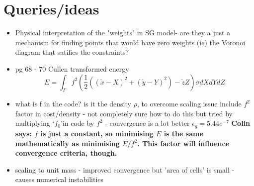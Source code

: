\documentclass[]{article}
\newcommand{\comments}[2]{{\bfseries #1 says: #2}}
\begin{document}
	\section{Queries/ideas}
	\begin{itemize}
		\item Physical interpretation of 
		the "weights" in SG model- are they a just a mechanism for finding points that would have zero weights (ie) the Voronoi diagram that satifies the constraints?
		\item pg 68 - 70 Cullen \cite{Cullen2008} transformed energy
		 \begin{equation}
		 E = \int_ \Gamma f^2 \left(\frac{1}{2}\left(\left( \tilde{x} - X\right)^2 +\left(\tilde{y} - Y\right)^2\right) - \tilde{z}Z\right)\sigma dXdYdZ
		 \end{equation}
	       \item what is f in the code? is it the density $\rho$, to overcome scaling issue include $f^2$ factor in cost/density - not completely sure how to do this but tried by multiplying \textquoteleft$f_0$\textquoteright in code by $f^2$ - convergence is a lot better $\epsilon_g = 5.44 e^{-7}$
                 \comments{Colin}{$f$ is just a constant, so minimising $E$ is the same mathematically as minimising $E/f^2$. This factor will influence convergence criteria, though.}
		 \item scaling to unit mass - improved convergence but 'area of cells' is small - causes numerical instabilities
	\end{itemize}

\newpage


\end{document}
